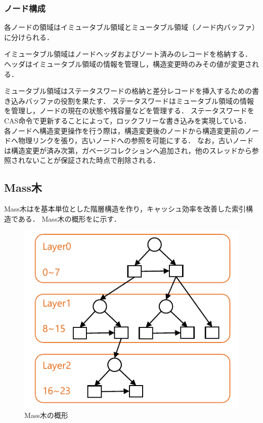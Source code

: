 \subsubsection{ノード構成}
各ノードの領域はイミュータブル領域とミュータブル領域（ノード内バッファ）に分けられる．

イミュータブル領域はノードヘッダおよびソート済みのレコードを格納する．
ヘッダはイミュータブル領域の情報を管理し，構造変更時のみその値が変更される．

ミュータブル領域はステータスワードの格納と差分レコードを挿入するための書き込みバッファの役割を果たす．
ステータスワードはミュータブル領域の情報を管理し，ノードの現在の状態や残容量などを管理する．
ステータスワードをCAS命令で更新することによって，ロックフリーな書き込みを実現している．
各ノードへ構造変更操作を行う際は，構造変更後のノードから構造変更前のノードへ物理リンクを張り，古いノードへの参照を可能にする．
なお，古いノードは構造変更が済み次第，ガベージコレクションへ追加され，他のスレッドから参照されないことが保証された時点で削除される．

\subsection{Mass木}
Mass木は\Bptree{}を基本単位とした階層構造を作り，キャッシュ効率を改善した索引構造である．
Mass木の概形を\Fig{\ref{fig:masstree}}に示す．

\begin{figure}[t]
    \centering
    \includegraphics{./figures/masstree.pdf}
    \caption{Mass木の概形}
    \label{fig:masstree}
\end{figure}

